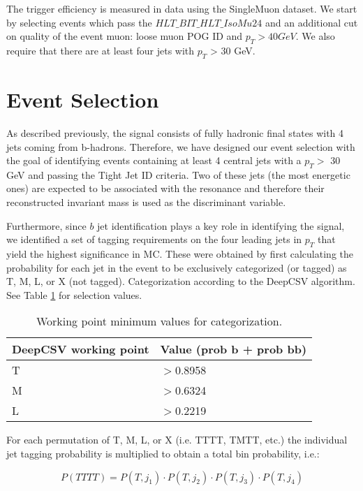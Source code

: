 The trigger efficiency is measured in data using the SingleMuon dataset. We start by selecting events which pass the $HLT\_BIT\_HLT\_IsoMu24$ and an additional cut on quality of the event muon: loose muon POG ID and $p_{T}>40GeV$. We also require that there are at least four jets with $p_{T}$ > 30 GeV.

\section{Event Selection \label{sec:selection}}

As described previously, the signal consists of fully hadronic final states with 4 jets coming from b-hadrons. Therefore, we have designed our event selection with the goal of identifying events containing at least 4 central jets with a $p_{T}>$ 30 GeV and passing the Tight Jet ID criteria. Two of these jets (the most energetic ones) are expected to be associated with the resonance and therefore their reconstructed invariant mass is used as the discriminant variable.

Furthermore, since $b$ jet identification plays a key role in identifying the signal, we identified a set of tagging requirements on the four leading jets in $p_{T}$ that yield the highest significance in MC. These were obtained by first calculating the probability for each jet in the event to be exclusively categorized (or tagged) as T, M, L, or X (not tagged). Categorization according to the DeepCSV algorithm. See Table \ref{tab:deepcsvval} for selection values.

\begin{table}[hbtp]\footnotesize
	\centering
	\begin{tabular}{l|l }
		\hline
		\textbf{DeepCSV working point} & Value (prob b + prob bb) \\
		\hline
		T &  $>$0.8958\\
		M &  $>$0.6324 \\
		L &  $>$0.2219\\
		\hline
	\end{tabular}
	\caption{Working point minimum values for categorization.}
	\label{tab:deepcsvval}
\end{table}

For each permutation of T, M, L, or X (i.e. TTTT, TMTT, etc.) the individual jet tagging probability is multiplied to obtain a total bin probability, i.e.:

\begin{equation}
P(TTTT) = P(T,j_{1})\cdot P(T,j_{2})\cdot P(T,j_{3})\cdot P(T,j_{4})
\label{eq:binprob}
\end{equation}

